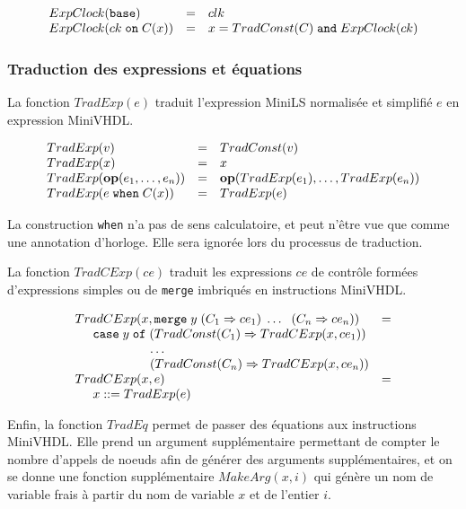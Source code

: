 \documentclass[a4paper]{article}
\newcommand{\minils}{{\sc MiniLS}}
\newcommand{\minivhdl}{{\sc MiniVHDL}}
\newcommand{\mybox}[1]{\mbox{\tt{#1}}}
\newcommand{\ind}[0]{\hspace{0.5cm}}
\newcommand{\coloneqq}[0]{::=}
\newcommand{\Op}[2]{\mybox{\bf{op}}(#1,\dots,#2)}
\newcommand{\When}[3]{#1 \; \mybox{when} \; #2(#3)}
\newcommand{\Merge}[5]{\mybox{merge} \; #1 \; (#2 \Rightarrow #3) \; \dots \; \
  (#4 \Rightarrow #5)}
\newcommand{\Base}[0]{\mybox{base}}
\newcommand{\On}[3]{#1 \; \mybox{on} \; #2 (#3)}
\newcommand{\Affect}[2]{#1 \coloneqq #2}
\begin{document}
\[
\begin{array}{lcl}
  \EC{\Base} & = & clk \\
  \EC{\On{ck}{C}{x}} & = & x = \TradC{C} \; \mathtt{and} \; \EC{ck}
\end{array}
\]

\subsubsection{Traduction des expressions et \'equations}

La fonction $TradExp(e)$ traduit l'expression \minils{} normalis\'ee et
simplifi\'e $e$ en expression \minivhdl{}.

\newcommand{\TradE}[1]{TradExp(#1)}

\[
\begin{array}{lcl}
  \TradE{v} & = & \TradC{v} \\
  \TradE{x} & = & x \\
  \TradE{\Op{e_1}{e_n}} & = & \Op{\TradE{e_1}}{\TradE{e_n}} \\
  \TradE{\When{e}{C}{x}} & = & \TradE{e}
\end{array}
\]

La construction \texttt{when} n'a pas de sens calculatoire, et peut n'\^etre vue
que comme une annotation d'horloge. Elle sera ignor\'ee lors du processus de
traduction.

La fonction $TradCExp(ce)$ traduit les expressions $ce$ de contr\^ole form\'ees
d'expressions simples ou de \texttt{merge} imbriqu\'es en instructions \minivhdl{}.

\newcommand{\TradCE}[2]{TradCExp(#1, #2)}

\[
\begin{array}{ll}
  \TradCE{x}{\Merge{y}{C_1}{ce_1}{C_n}{ce_n}} & = \\
  \ind \mathtt{case} \; y \; \mathtt{of} \;
  (\TradC{C_1} \Rightarrow \TradCE{x}{ce_1}) \\
  \hspace{2.1cm} \dots \\
  \hspace{2.1cm} (\TradC{C_n} \Rightarrow \TradCE{x}{ce_n}) \\
  \TradCE{x}{e} & = \\
  \ind \Affect{x}{\TradE{e}}
\end{array}
\]

Enfin, la fonction $TradEq$ permet de passer des \'equations aux
instructions \minivhdl{}. Elle prend un argument suppl\'ementaire
permettant de compter le nombre d'appels de noeuds afin de g\'en\'erer des
arguments suppl\'ementaires, et on se donne une fonction suppl\'ementaire
$MakeArg(x,i)$ qui g\'en\`ere un nom de variable frais \`a partir du nom de
variable $x$ et de l'entier $i$.
\end{document}
